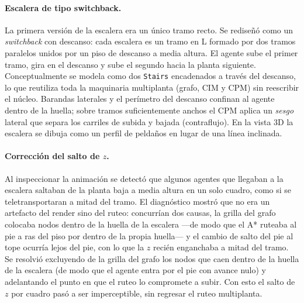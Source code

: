 \documentclass[11pt,a4paper]{article}
\begin{document}
\paragraph{Escalera de tipo switchback.}
La primera versión de la escalera era un único tramo recto. Se rediseñó como un
\emph{switchback} con descanso: cada escalera es un tramo en L formado por dos tramos paralelos
unidos por un piso de descanso a media altura. El agente sube el primer tramo, gira en el
descanso y sube el segundo hacia la planta siguiente. Conceptualmente se modela como dos
\texttt{Stairs} encadenados a través del descanso, lo que reutiliza toda la maquinaria
multiplanta (grafo, CIM y CPM) sin reescribir el núcleo. Barandas laterales y el perímetro del
descanso confinan al agente dentro de la huella; sobre tramos suficientemente anchos el CPM
aplica un \emph{sesgo} lateral que separa los carriles de subida y bajada (contraflujo). En la
vista 3D la escalera se dibuja como un perfil de peldaños en lugar de una línea inclinada.

\paragraph{Corrección del salto de $z$.}
Al inspeccionar la animación se detectó que algunos agentes que llegaban a la escalera saltaban
de la planta baja a media altura en un solo cuadro, como si se teletransportaran a mitad del
tramo. El diagnóstico mostró que no era un artefacto del render sino del ruteo: concurrían dos causas,
la grilla del grafo colocaba nodos dentro de la huella de la escalera ---de modo que el A*
ruteaba al pie a ras del piso por dentro de la propia huella--- y el cambio de salto del pie al tope ocurría
lejos del pie, con lo que la $z$ recién enganchaba a mitad del tramo. Se resolvió excluyendo de
la grilla del grafo los nodos que caen dentro de la huella de la escalera (de modo que el agente
entra por el pie con avance nulo) y adelantando el punto en que el ruteo lo compromete a subir.
Con esto el salto de $z$ por cuadro pasó a ser imperceptible, sin regresar el ruteo multiplanta.
\end{document}
